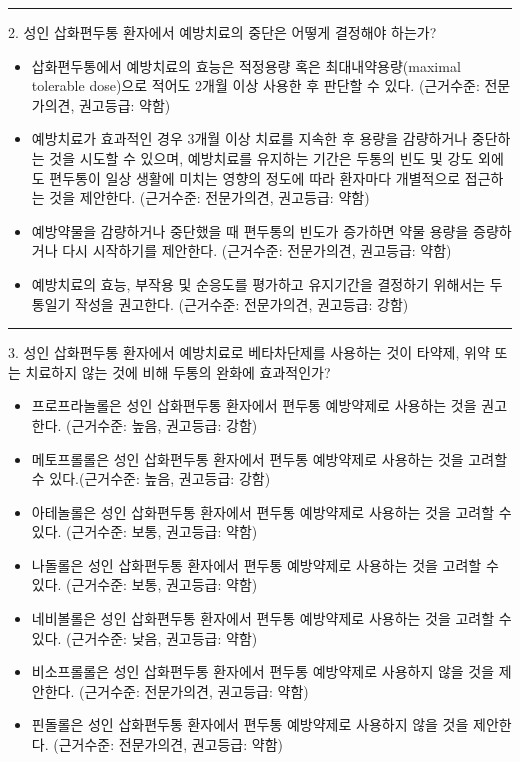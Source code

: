 \documentclass[]{book}
\begin{document}
\begin{center}\rule{0.5\linewidth}{\linethickness}\end{center}

2. 성인 삽화편두통 환자에서 예방치료의 중단은 어떻게 결정해야 하는가?

\begin{itemize}
\item
  삽화편두통에서 예방치료의 효능은 적정용량 혹은 최대내약용량(maximal tolerable dose)으로 적어도 2개월 이상 사용한 후 판단할 수 있다. (근거수준: 전문가의견, 권고등급: 약함)
\item
  예방치료가 효과적인 경우 3개월 이상 치료를 지속한 후 용량을 감량하거나 중단하는 것을 시도할 수 있으며, 예방치료를 유지하는 기간은 두통의 빈도 및 강도 외에도 편두통이 일상 생활에 미치는 영향의 정도에 따라 환자마다 개별적으로 접근하는 것을 제안한다. (근거수준: 전문가의견, 권고등급: 약함)
\item
  예방약물을 감량하거나 중단했을 때 편두통의 빈도가 증가하면 약물 용량을 증량하거나 다시 시작하기를 제안한다. (근거수준: 전문가의견, 권고등급: 약함)
\item
  예방치료의 효능, 부작용 및 순응도를 평가하고 유지기간을 결정하기 위해서는 두통일기 작성을 권고한다. (근거수준: 전문가의견, 권고등급: 강함)
\end{itemize}

\begin{center}\rule{0.5\linewidth}{\linethickness}\end{center}

3. 성인 삽화편두통 환자에서 예방치료로 베타차단제를 사용하는 것이 타약제, 위약 또는 치료하지 않는 것에 비해 두통의 완화에 효과적인가?

\begin{itemize}
\item
  프로프라놀롤은 성인 삽화편두통 환자에서 편두통 예방약제로 사용하는 것을 권고한다. (근거수준: 높음, 권고등급: 강함)
\item
  메토프롤롤은 성인 삽화편두통 환자에서 편두통 예방약제로 사용하는 것을 고려할 수 있다.(근거수준: 높음, 권고등급: 강함)
\item
  아테놀롤은 성인 삽화편두통 환자에서 편두통 예방약제로 사용하는 것을 고려할 수 있다. (근거수준: 보통, 권고등급: 약함)
\item
  나돌롤은 성인 삽화편두통 환자에서 편두통 예방약제로 사용하는 것을 고려할 수 있다. (근거수준: 보통, 권고등급: 약함)
\item
  네비볼롤은 성인 삽화편두통 환자에서 편두통 예방약제로 사용하는 것을 고려할 수 있다. (근거수준: 낮음, 권고등급: 약함)
\item
  비소프롤롤은 성인 삽화편두통 환자에서 편두통 예방약제로 사용하지 않을 것을 제안한다. (근거수준: 전문가의견, 권고등급: 약함)
\item
  핀돌롤은 성인 삽화편두통 환자에서 편두통 예방약제로 사용하지 않을 것을 제안한다. (근거수준: 전문가의견, 권고등급: 약함)
\end{itemize}
\end{document}
